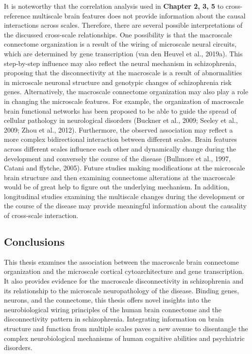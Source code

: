 \begin{refsection}
It is noteworthy that the correlation analysis used in \textbf{Chapter 2, 3, 5} to cross-reference multiscale brain features does not provide information about the causal interactions across scales. Therefore, there are several possible interpretations of the discussed cross-scale relationships. One possibility is that the macroscale connectome organization is a result of the wiring of microscale neural circuits, which are determined by gene transcription (van den Heuvel et al., 2019a). This step-by-step influence may also reflect the neural mechanism in schizophrenia, proposing that the disconnectivity at the macroscale is a result of abnormalities in microscale neuronal structure and genotypic changes of schizophrenia risk genes. Alternatively, the macroscale connectome organization may also play a role in changing the microscale features. For example, the organization of macroscale brain functional networks has been proposed to be able to guide the spread of cellular pathology in neurological disorders (Buckner et al., 2009; Seeley et al., 2009; Zhou et al., 2012). Furthermore, the observed association may reflect a more complex bidirectional interaction between different scales. Brain features across different scales influence each other and dynamically change during the development and conversely the course of the disease (Bullmore et al., 1997, Catani and ffytche, 2005). Future studies making modifications at the microscale brain structure and then examining connectome alterations at the macroscale would be of great help to figure out the underlying mechanism. In addition, longitudinal studies examining the multiscale changes during the development or the course of the disease may provide meaningful information about the causality of cross-scale interaction.

\subsection*{Conclusions}
This thesis examines the association between the macroscale brain connectome organization and the microscale cortical cytoarchitecture and gene transcription. It also provides evidence for the macroscale disconnectivity in schizophrenia and its relationship to the microscale neuropathology of the disease. Binding genes, neurons, and the connectome, this thesis offers novel insights into the neurobiological wiring principles of the human brain connectome and the disconnectivity pattern in schizophrenia. Integrating information on brain structure and function from multiple scales paves a new avenue to disentangle the complex neurobiological mechanisms of human cognitive abilities and psychiatric disorders.

\end{refsection}